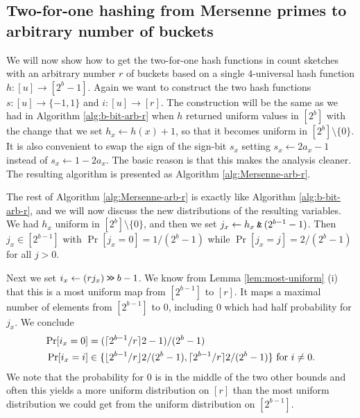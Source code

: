 \subsection{Two-for-one hashing from Mersenne primes to arbitrary number of buckets}
We will now show how to get the two-for-one hash functions in count
sketches with an arbitrary number $r$ of buckets based on a single
$4$-universal hash function $h:[u]\to [2^b-1]$.  Again we want to
construct the two hash functions $s:[u]\to\{-1,1\}$ and
$i:[u]\to[r]$.  The construction will be the same as we had in
Algorithm \ref{alg:b-bit-arb-r} when $h$ returned uniform values in
$[2^b]$ with the change that we set $h_x\gets h(x)+1$, so that it
becomes uniform in $[2^b]\setminus\{0\}$. It is also convenient to
swap the sign of the sign-bit $s_x$ setting $s_x\gets 2a_x - 1$ instead
of $s_x\gets 1-2a_x$. The basic reason is that this makes the analysis
cleaner. The resulting algorithm
is presented as Algorithm \ref{alg:Mersenne-arb-r}.
The rest of Algorithm \ref{alg:Mersenne-arb-r} is exactly like 
Algorithm \ref{alg:b-bit-arb-r}, and we will now discuss the new
distributions of the resulting variables. We had
$h_x$ uniform in $[2^b]\setminus\{0\}$, and then we set
$j_x \gets h_x\mathbin{\texttt{\&}}(2^{b-1}-1)$. Then $j_x\in[2^{b-1}]$ with 
$\Pr[j_x=0]=1/(2^{b}-1)$ while  $\Pr[j_x=j]=2/(2^{b}-1)$ for all $j>0$.

Next we set $i_x\gets (rj_x)\mathbin{\texttt{>\!>}} b-1$. We know from Lemma
\ref{lem:most-uniform} (i) that this is a most uniform map from
$[2^{b-1}]$ to $[r]$.  It maps a maximal number of elements from
$[2^{b-1}]$ to $0$, including $0$ which had half probability for
$j_x$.
We conclude
\begin{align}
   \Pr[i_x=0] &= (\lceil {2^{b-1}/r}\rceil2-1)/(2^{b}-1)
   \label{eq:prix0}
   \\
   \Pr[i_x = i] &\in
   \{\lfloor {2^{b-1}/r} \rfloor2/(2^{b}-1), \lceil {2^{b-1}/r}\rceil2/(2^{b}-1)\}
   \mbox{ for $i \neq  0$}
   \label{eq:prixneq0}
   .
\end{align}
We note
that the probability for $0$ is in the middle of the two other
bounds and often this yields a more uniform distribution on $[r]$ than
the most uniform distribution we could get from the
uniform distribution on $[2^{b-1}]$.

